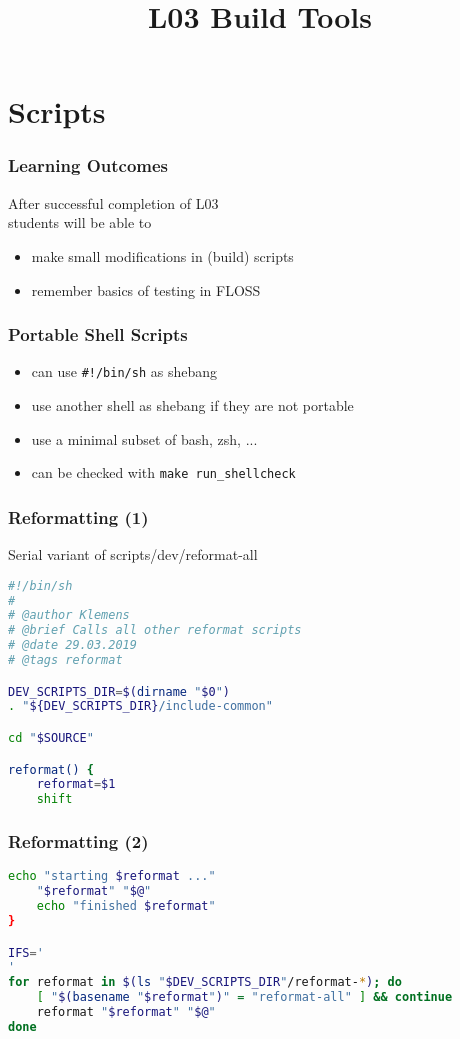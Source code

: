 

\title{L03 Build Tools}



\section{Scripts}

\begin{frame}
	\frametitle{Learning Outcomes}
	After successful completion of L03 \\
	students will be able to

	\begin{itemize}
	\item make small modifications in (build) scripts
	\item remember basics of testing in FLOSS
	\end{itemize}
\end{frame}

\begin{frame}[fragile]
	\frametitle{Portable Shell Scripts}

	\begin{itemize}[<+-| alert@+>]
	\item can use \verb+#!/bin/sh+ as shebang
	\item use another shell as shebang if they are not portable
	\item use a minimal subset of bash, zsh, ...
	\item can be checked with \verb+make run_shellcheck+
	\end{itemize}
\end{frame}

\begin{frame}[fragile]
	\frametitle{Reformatting (1)}

	Serial variant of scripts/dev/reformat-all

	\begin{lstlisting}[language=sh]
#!/bin/sh
#
# @author Klemens
# @brief Calls all other reformat scripts
# @date 29.03.2019
# @tags reformat

DEV_SCRIPTS_DIR=$(dirname "$0")
. "${DEV_SCRIPTS_DIR}/include-common"

cd "$SOURCE"

reformat() {
	reformat=$1
	shift
	\end{lstlisting}
\end{frame}

\begin{frame}[fragile]
	\frametitle{Reformatting (2)}

	\begin{lstlisting}[language=sh]
	echo "starting $reformat ..."
	"$reformat" "$@"
	echo "finished $reformat"
}

IFS='
'
for reformat in $(ls "$DEV_SCRIPTS_DIR"/reformat-*); do
	[ "$(basename "$reformat")" = "reformat-all" ] && continue
	reformat "$reformat" "$@"
done\end{lstlisting}
\end{frame}

